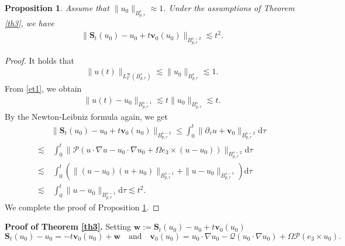 \documentclass[12pt]{article}
\newtheorem{proposition}{Proposition}[section]
\newcommand{\bal}{\begin{align}}
\newcommand{\bbal}{\begin{align*}}
\newcommand{\na}{\nabla}
\newcommand{\cd}{\cdot}
\newcommand{\dd}{\mathrm{d}}
\newcommand{\les}{\lesssim}
\newcommand{\f}{\left}
\newcommand{\g}{\right}
\begin{document}
\begin{proposition}\label{pro2}
Assume that $\|u_0\|_{B^s_{p,r}}\approx1$. Under the assumptions of Theorem \ref{th3}, we have
\begin{align*}
\|\mathbf{S}_{t}(u_0)-u_0+t\mathbf{v}_0(u_0)\|_{{B}^{s-2}_{p,r}}\lesssim t^{2}.
\end{align*}
\end{proposition}
\begin{proof}
It holds that
\bbal
\|u(t)\|_{L^\infty_T(B^s_{p,r})}\les\|u_0\|_{B^s_{p,r}}\les1.
\end{align*}
From \eqref{et1}, we obtain
\bal
\|u(t)-u_0\|_{B^{s-1}_{p,r}}\les t\|u_0\|_{B^{s}_{p,r}}\les t.
\end{align}
By the Newton-Leibniz formula again, we get
\begin{align}
&\|\mathbf{S}_{t}(u_0)-u_0+t\mathbf{v}_0(u_0)\|_{{B}^{s-2}_{p,r}}
\leq \int^t_0\|\partial_\tau u+\mathbf{v}_0\|_{{B}^{s-2}_{p,r}} \dd\tau \nonumber\\
\les&~ \int^t_0\|\mathcal{P}\f(u\cd\na u-u_0\cd\na u_0+\Omega e_3\times (u-u_0)\g)\|_{{B}^{s-2}_{p,r}} \dd\tau
\nonumber\\
\les&~  \int^t_0\f(\|(u-u_0)(u+u_0)\|_{B^{s-1}_{p,r}}+\|u-u_0\|_{B^{s-1}_{p,r}}\g)\dd\tau\nonumber
\\
\les&~ \int^t_0\|u-u_0\|_{B^{s-1}_{p,r}} \dd\tau\nonumber
\les t^2.
\end{align}
We complete the proof of Proposition \ref{pro2}.
\end{proof}

{\bf Proof of Theorem \ref{th3}.}   Setting $\mathbf{w}:=\mathbf{S}_{t}(u_0)-u_0+t\mathbf{v}_0(u_0)$
$$\mathbf{S}_{t}(u_0)-u_0=-t\mathbf{v}_0(u_0)+\mathbf{w} \quad \text{and}\quad \mathbf{v}_0(u_0)=u_0\cd\na u_0-\mathcal{Q}(u_0\cd\na u_0)+\Omega\mathcal{P}(e_3\times u_0).$$
\end{document}
